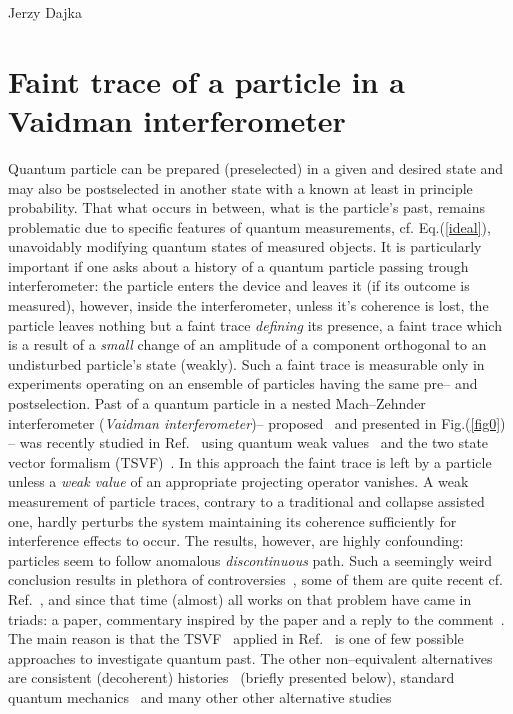 \begin{artengenv}{Jerzy Dajka}
\section{Faint trace of a particle in a Vaidman interferometer}



Quantum particle can be prepared (preselected) in a given and desired state and may also be postselected in another state with a known at least in principle probability. That what occurs in between, what is the particle's past, remains problematic due to specific features of quantum measurements, cf. Eq.(\ref{ideal}), unavoidably modifying quantum states of measured objects. It is particularly important if one asks about a history of a quantum particle passing trough interferometer: the particle enters the device and leaves it (if its outcome is measured), however, inside the interferometer, unless it's coherence is lost, the particle leaves nothing but a faint trace {\it defining} its presence, a faint trace which
is a result of a {\it small} change of an amplitude of a component orthogonal to an undisturbed particle's state (weakly). Such a faint trace is measurable  only in experiments operating on an
ensemble of particles having the same pre-- and postselection.
%
%
Past of a quantum particle in a nested Mach--Zehnder interferometer ({\it Vaidman interferometer})-- proposed~\parencite{PhysRevA.87.052104} and presented in Fig.(\ref{fig0})  -- was recently studied in Ref.~\parencite{PhysRevA.87.052104} using 
quantum weak values~\parencite{primus,weak,Aharonov2008} and the two state vector formalism (TSVF)~\parencite{Aharonov2008}. In this approach the faint trace is left by a particle unless a {\it weak value} of an appropriate projecting operator vanishes. A weak measurement of particle traces, contrary to a traditional and collapse assisted one, hardly perturbs the system maintaining its coherence sufficiently for interference effects to occur. The results, however, are highly confounding:  particles seem to follow anomalous {\it discontinuous} path. Such a seemingly weird conclusion results in plethora of controversies~\parencite{PhysRevA.88.046102,PhysRevA.88.046103}, some of them are quite recent cf. Ref.~\parencite{lady}, and since that time  (almost) all  works  on that problem  have came in triads: a paper, commentary inspired by the paper and a reply to the comment~\parencite{PhysRevA.88.046102,PhysRevA.88.046103}.  
The main reason is that the TSVF~\parencite{Aharonov2008} applied in Ref.~\parencite{PhysRevA.87.052104} is one of few possible approaches to investigate quantum past. The other non--equivalent alternatives are consistent (decoherent) histories~\parencite{PhysRevA.94.032115,PhysRevA.95.066101} (briefly presented below), standard quantum mechanics~\parencite{PhysRevA.96.022126,PhysRevA.99.026103,PhysRevA.99.026104} and many other other alternative studies

\end{artengenv}
